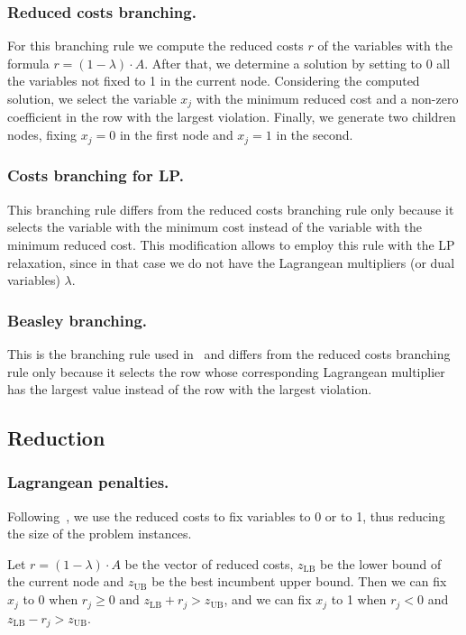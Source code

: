 \documentclass[runningheads]{llncs}
\begin{document}
\subsubsection{Reduced costs branching.} For this branching rule we compute the reduced costs $r$ of the variables with the formula $r = (1 - \lambda) \cdot A$. After that, we determine a solution by setting to 0 all the variables not fixed to 1 in the current node. Considering the computed solution, we select the variable $x_j$ with the minimum reduced cost and a non-zero coefficient in the row with the largest violation. Finally, we generate two children nodes, fixing $x_j = 0$ in the first node and $x_j = 1$ in the second.

\subsubsection{Costs branching for LP.} This branching rule differs from the reduced costs branching rule only because it selects the variable with the minimum cost instead of the variable with the minimum reduced cost. This modification allows to employ this rule with the LP relaxation, since in that case we do not have the Lagrangean multipliers (or dual variables) $\lambda$. 

\subsubsection{Beasley branching.} This is the branching rule used in~\cite{beasley-1987-algorithm} and differs from the reduced costs branching rule only because it selects the row whose corresponding Lagrangean multiplier has the largest value instead of the row with the largest violation.

\subsection{Reduction}
\label{subsec:branch-bound:reduction}

\subsubsection{Lagrangean penalties.} Following~\cite{beasley-1987-algorithm}, we use the reduced costs to fix variables to 0 or to 1, thus reducing the size of the problem instances. 

Let $r = (1 - \lambda) \cdot A$ be the vector of reduced costs, $z_{\text{LB}}$ be the lower bound of the current node and $z_{\text{UB}}$ be the best incumbent upper bound. Then we can fix $x_j$ to 0 when $r_j \ge 0$ and $z_{\text{LB}} + r_j > z_{\text{UB}}$, and we can fix $x_j$ to 1 when $r_j < 0$ and $z_{\text{LB}} - r_j > z_{\text{UB}}$.  
\end{document}
